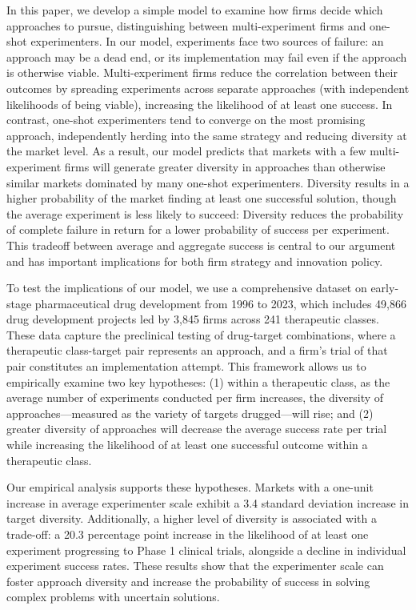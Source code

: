 In this paper, we develop a simple model to examine how firms decide which approaches to pursue, distinguishing between multi-experiment firms and one-shot experimenters. In our model, experiments face two sources of failure: an approach may be a dead end, or its implementation may fail even if the approach is otherwise viable. Multi-experiment firms reduce the correlation between their outcomes by spreading experiments across separate approaches (with independent likelihoods of being viable), increasing the likelihood of at least one success. In contrast, one-shot experimenters tend to converge on the most promising approach, independently herding into the same strategy and reducing diversity at the market level. As a result, our model predicts that markets with a few multi-experiment firms will generate greater diversity in approaches than otherwise similar markets dominated by many one-shot experimenters. Diversity results in a higher probability of the market finding at least one successful solution, though the average experiment is less likely to succeed: Diversity reduces the probability of complete failure in return for a lower probability of success per experiment. This tradeoff between average and aggregate success is central to our argument and has important implications for both firm strategy and innovation policy.



To test the implications of our model, we use a comprehensive dataset on early-stage pharmaceutical drug development from 1996 to 2023, which includes 49,866 drug development projects led by 3,845 firms across 241 therapeutic classes. These data capture the preclinical testing of drug-target combinations, where a therapeutic class-target pair represents an approach, and a firm’s trial of that pair constitutes an implementation attempt. This framework allows us to empirically examine two key hypotheses: (1) within a therapeutic class, as the average number of experiments conducted per firm increases, the diversity of approaches---measured as the variety of targets drugged---will rise; and (2) greater diversity of approaches will decrease the average success rate per trial while increasing the likelihood of at least one successful outcome within a therapeutic class.

Our empirical analysis supports these hypotheses. Markets with a one-unit increase in average experimenter scale exhibit a 3.4 standard deviation increase in target diversity. Additionally, a higher level of diversity is associated with a trade-off: a 20.3 percentage point increase in the likelihood of at least one experiment progressing to Phase 1 clinical trials, alongside a decline in individual experiment success rates. These results show that the experimenter scale can foster approach diversity and increase the probability of success in solving complex problems with uncertain solutions.

